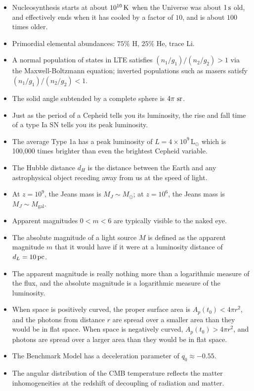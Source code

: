 \documentclass[a4paper,10pt]{article}
\begin{document}
\begin{itemize}
    \item Nucleosynthesis starts at about $10^{10}\,{\rm K}$ when the Universe was about $1\,{\rm s}$ old, and effectively ends when it has cooled by a factor of $10$, and is about $100$ times older.
    \item Primordial elemental abundances: $75\%$ H, $25\%$ He, trace Li.
    \item A normal population of states in LTE satisfies $(n_1/g_1)/(n_2/g_2)>1$ via the Maxwell-Boltzmann equation; inverted populations such as masers satisfy $(n_1/g_1)/(n_2/g_2)<1$.
    \item The solid angle subtended by a complete sphere is $4\pi~{\rm sr}$.
    \item Just as the period of a Cepheid tells you its luminosity, the rise and fall time of a type Ia SN tells you its peak luminosity.
    \item The average Type 1a has a peak luminosity of $L=4\times10^9\,\mathrm{L}_\odot$ which is 100,000 times brighter than even the brightest Cepheid variable.
    \item The Hubble distance $d_H$ is the distance between the Earth and any astrophysical object receding away from us at the speed of light.
    \item At $z=10^9$, the Jeans mass is $M_J\sim M_\odot$; at $z=10^6$, the Jeans mass is $M_J\sim M_\mathrm{gal}$.
    \item Apparent magnitudes $0<m<6$ are typically visible to the naked eye.
    \item The absolute magnitude of a light source $M$ is defined as the apparent magnitude $m$ that it would have if it were at a luminosity distance of $d_L = 10\,{\rm pc}$.
    \item The apparent magnitude is really nothing more than a logarithmic measure of the flux, and the absolute magnitude is a logarithmic measure of the luminosity.
    \item When space is positively curved, the proper surface area is $A_p(t_0) < 4\pi r^2$, and the photons from distance $r$ are spread over a smaller area than they would be in flat space. When space is negatively curved, $A_p(t_0) > 4\pi r^2$, and photons are spread over a larger area than they would be in flat space.
    \item The Benchmark Model has a deceleration parameter of $q_0\approx−0.55$.
    \item The angular distribution of the CMB temperature reflects the matter inhomogeneities at the redshift of decoupling of radiation and matter.

\end{itemize}
\end{document}
